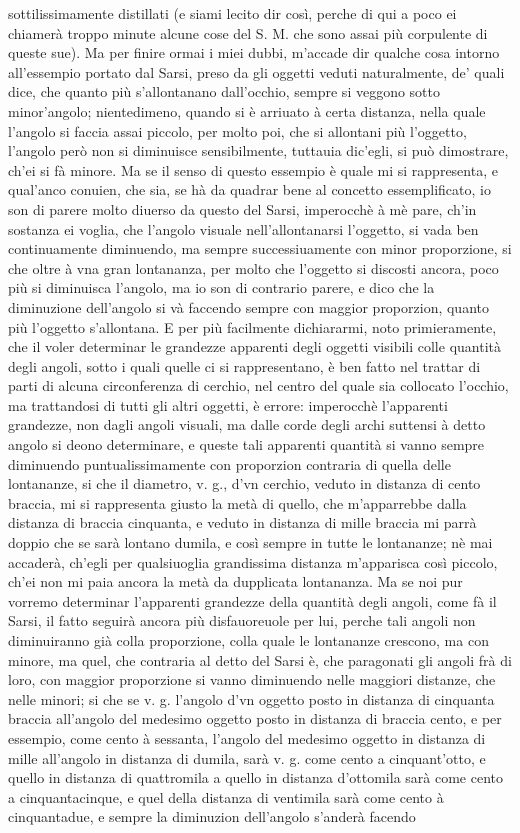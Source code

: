 \documentclass[11pt,twoside,openany]{book}
\begin{document}
sottilissimamente distillati (e siami lecito dir così, perche di qui a poco ei chiamerà troppo minute alcune cose del S. M. che sono assai più corpulente di queste sue). Ma per finire ormai i miei dubbi, m'accade dir qualche cosa intorno all'essempio portato dal Sarsi, preso da gli oggetti veduti naturalmente, de' quali dice, che quanto più s'allontanano dall'occhio, sempre si veggono sotto minor'angolo; nientedimeno, quando si è arriuato à certa distanza, nella quale l'angolo si faccia assai piccolo, per molto poi, che si allontani più l'oggetto, l'angolo però non si diminuisce sensibilmente, tuttauia dic'egli, si può dimostrare, ch'ei si fà minore. Ma se il senso di questo essempio è quale mi si rappresenta, e qual'anco conuien, che sia, se hà da quadrar bene al concetto essemplificato, io son di parere molto diuerso da questo del Sarsi, imperocchè à mè pare, ch'in sostanza ei voglia, che l'angolo visuale nell'allontanarsi l'oggetto, si vada ben continuamente diminuendo, ma sempre successiuamente con minor proporzione, si che oltre à vna gran lontananza, per molto che l'oggetto si discosti ancora, poco più si diminuisca l'angolo, ma io son di contrario parere, e dico che la diminuzione dell'angolo si và faccendo sempre con maggior proporzion, quanto più l'oggetto s'allontana. E per più facilmente dichiararmi, noto primieramente, che il voler determinar le grandezze apparenti degli oggetti visibili colle quantità degli angoli, sotto i quali quelle ci si rappresentano, è ben fatto nel trattar di parti di alcuna circonferenza di cerchio, nel centro del quale sia collocato l'occhio, ma trattandosi di tutti gli altri oggetti, è errore: imperocchè l'apparenti grandezze, non dagli angoli visuali, ma dalle corde degli archi suttensi à detto angolo si deono determinare, e queste tali apparenti quantità si vanno sempre diminuendo puntualissimamente con proporzion contraria di quella delle lontananze, si che il diametro, v. g., d'vn cerchio, veduto in distanza di cento braccia, mi si rappresenta giusto la metà di quello, che m'apparrebbe dalla distanza di braccia cinquanta, e veduto in distanza di mille braccia mi parrà doppio che se sarà lontano dumila, e così sempre in tutte le lontananze; nè mai accaderà, ch'egli per qualsiuoglia grandissima distanza m'apparisca così piccolo, ch'ei non mi paia ancora la metà da dupplicata lontananza. Ma se noi pur vorremo determinar l'apparenti grandezze della quantità degli angoli, come fà il Sarsi, il fatto seguirà ancora più disfauoreuole per lui, perche tali angoli non diminuiranno già colla proporzione, colla quale le lontananze crescono, ma con minore, ma quel, che contraria al detto del Sarsi è, che paragonati gli angoli frà di loro, con maggior proporzione si vanno diminuendo nelle maggiori distanze, che nelle minori; si che se v. g. l'angolo d'vn oggetto posto in distanza di cinquanta braccia all'angolo del medesimo oggetto posto in distanza di braccia cento, e per essempio, come cento à sessanta, l'angolo del medesimo oggetto in distanza di mille all'angolo in distanza di dumila, sarà v. g. come cento a cinquant'otto, e quello in distanza di quattromila a quello in distanza d'ottomila sarà come cento a cinquantacinque, e quel della distanza di ventimila sarà come cento à cinquantadue, e sempre la diminuzion dell'angolo s'anderà facendo 
\end{document}
